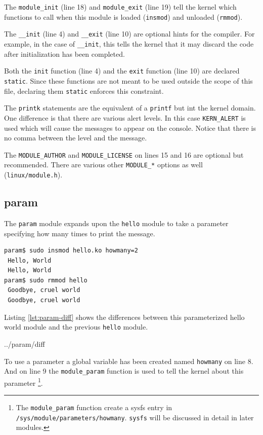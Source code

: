 \documentclass{article}
\begin{document}
The \verb+module_init+ (line 18) and \verb+module_exit+ (line 19) tell
the kernel which functions to call when this module is
loaded (\verb+insmod+) and unloaded (\verb+rmmod+).

The \verb+__init+ (line 4) and \verb+__exit+ (line 10)
are optional hints for the compiler.  For example, in the case of
\verb+__init+, this tells the kernel that it may discard the code
after initialization has been completed.

Both the \verb+init+ function (line 4) and the \verb+exit+ function (line 10)
are declared \verb+static+.
Since these functions are not meant to be used outside the scope
of this file, declaring them \verb+static+ enforces this
constraint\autocite[Pg. 52]{corbet2009linux}.

The \verb+printk+ statements are the equivalent of a \verb+printf+ but
int the kernel domain.
One difference is that there are various alert levels.
In this case \verb+KERN_ALERT+ is used which will cause the messages
to appear on the console.
Notice that there is no comma between the level and the message.

The \verb+MODULE_AUTHOR+ and \verb+MODULE_LICENSE+ on lines 15 and 16
are optional but recommended\autocite[Pg. 51]{corbet2009linux}.
There are various other \verb+MODULE_*+
options as well (\verb+linux/module.h+).

\clearpage
\subsection{param}

The \verb+param+ module expands upon the \verb+hello+ module to
take a parameter specifying how many times to print the message.

\begin{verbatim}
param$ sudo insmod hello.ko howmany=2
 Hello, World
 Hello, World
param$ sudo rmmod hello
 Goodbye, cruel world
 Goodbye, cruel world
\end{verbatim}

Listing \ref{lst:param-diff} shows the differences between this
parameterized hello world module and the previous \verb+hello+ module.


	{../param/diff}

To use a parameter a global variable has been created named \verb+howmany+
on line 8.
And on line 9 the \verb+module_param+ function is used to tell
the kernel about this parameter
\footnote{The \verb+module_param+ function create a sysfs entry
in \verb+/sys/module/parameters/howmany+.  \verb+sysfs+ will
be discussed in detail in later modules.}.
\end{document}
